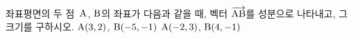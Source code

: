 좌표평면의 두 점~$\mathrm{A}$, $\mathrm{B}$의 좌표가 다음과 같을 때, 벡터 $\overrightarrow{\mathrm{AB}}$를 성분으로 나타내고, 그 크기를 구하시오.
 $\mathrm{A}(3{,}\mkern3mu\mathopen{}2)$, $\mathrm{B}(-5{,}\mkern3mu\mathopen{}-1)$
 $\mathrm{A}(-2{,}\mkern3mu\mathopen{}3)$, $\mathrm{B}(4{,}\mkern3mu\mathopen{}-1)$
